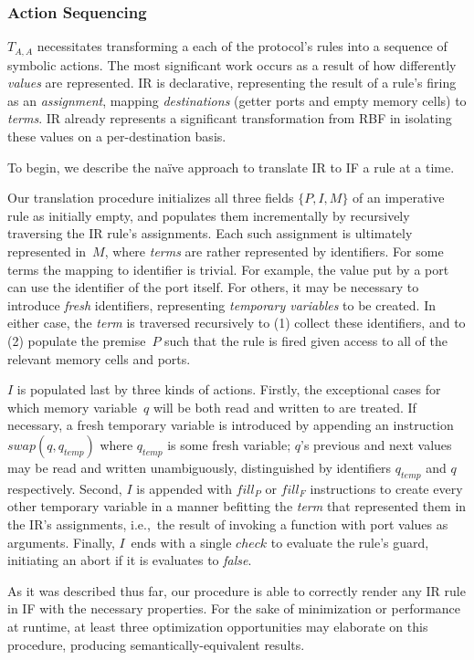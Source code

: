 \subsubsection{Action Sequencing}
$T_{A,A}$ necessitates transforming a each of the protocol's rules into a sequence of symbolic actions. The most significant work occurs as a result of how differently \textit{values} are represented. IR is declarative, representing the result of a rule's firing as an \textit{assignment}, mapping \textit{destinations} (getter ports and empty memory cells) to \textit{terms}. IR already represents a significant transformation from RBF in isolating these values on a per-destination basis. 

To begin, we describe the na\"ive approach to translate IR to IF a rule at a time.

Our translation procedure initializes all three fields $\{P, I, M\}$ of an imperative rule as initially empty, and populates them incrementally by recursively traversing the IR rule's assignments. Each such assignment is ultimately represented in~$M$, where \textit{terms} are rather represented by identifiers. For some terms the mapping to identifier is trivial. For example, the value put by a port can use the identifier of the port itself. For others, it may be necessary to introduce \textit{fresh} identifiers, representing \textit{temporary variables} to be created. In either case, the \textit{term} is traversed recursively to (1) collect these identifiers, and to (2) populate the premise~$P$ such that the rule is fired given access to all of the relevant memory cells and ports.

$I$ is populated last by three kinds of actions. Firstly, the exceptional cases for which memory variable~$q$ will be both read and written to are treated. If necessary, a fresh temporary variable is introduced by appending an instruction $swap(q, q_{temp})$ where $q_{temp}$ is some fresh variable; $q$'s previous and next values may be read and written unambiguously, distinguished by identifiers $q_{temp}$ and $q$ respectively. Second, $I$ is appended with $fill_P$ or $fill_F$ instructions to create every other temporary variable in a manner befitting the \textit{term} that represented them in the IR's assignments, i.e.,\ the result of invoking a function with port values as arguments. Finally, $I$~ends with a single $check$ to evaluate the rule's guard, initiating an abort if it is evaluates to \textit{false}.

As it was described thus far, our procedure is able to correctly render any IR rule in IF with the necessary properties. For the sake of minimization or performance at runtime, at least three optimization opportunities may elaborate on this procedure, producing semantically-equivalent results.

